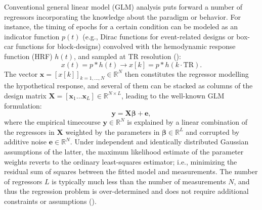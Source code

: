 Conventional general linear model (GLM) analysis puts forward a number of regressors incorporating the knowledge about the paradigm or behavior. For instance, the timing of epochs for a certain condition can be modeled as an indicator function $p(t)$ (e.g., Dirac functions for event-related designs or box-car functions for block-designs) convolved with the hemodynamic response function (HRF) $h(t)$, and sampled at TR resolution (\citealt{Friston1994AnalysisfunctionalMRI,Friston1998EventRelatedfMRI,Boynton1996LinearSystemsAnalysis,Cohen1997ParametricAnalysisfMRI}):
$$
   x(t) = p*h(t) \rightarrow x[k] = p*h(k\cdot\text{TR}).
$$
The vector $\mathbf{x}=[x[k]]_{k=1,\ldots,N}  \in \mathbb{R}^{N}$ then constitutes the regressor modelling the hypothetical response, and several of them can be stacked as columns of the design matrix $\mathbf{X}=[\mathbf{x}_1 \ldots \mathbf{x}_L] \in \mathbb{R}^{N \times L}$, leading to the well-known GLM formulation: 
\begin{equation}
    \label{eq:glm}
    \mathbf{y} = \mathbf{X} \boldsymbol\beta + \mathbf{e},
\end{equation}
where the empirical timecourse $\mathbf{y} \in \mathbb{R}^{N}$ is explained by a linear combination of the regressors in $\mathbf{X}$ weighted by the parameters in $\boldsymbol\beta \in \mathbb{R}^{L}$ and corrupted by additive noise $\mathbf{e}\in \mathbb{R}^{N}$. Under independent and identically distributed Gaussian assumptions of the latter, the maximum likelihood estimate of the parameter weights reverts to the ordinary least-squares estimator; i.e., minimizing the residual sum of squares between the fitted model and measurements. The number of regressors $L$ is typically much less than the number of measurements $N$, and thus the regression problem is over-determined and does not require additional constraints or assumptions (\citealt{HENSON2007178}).

